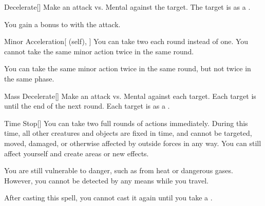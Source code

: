 \lowercase{\hypertarget{spell:Decelerate}{}}\label{spell:Decelerate}
\begin{freeability}[Rank 6]{\hypertarget{spell:Decelerate}{Decelerate}}[]
Make an attack vs. Mental against the target.
\hit The target is  as a .

\rankline
{} You gain a  bonus to  with the attack.
\end{freeability}
\vspace{0.25em}



\lowercase{\hypertarget{spell:Minor Acceleration}{}}\label{spell:Minor Acceleration}
\begin{attuneability}[Rank 6]{\hypertarget{spell:Minor Acceleration}{Minor Acceleration}}[ (self), ]
You can take two  each round instead of one.
You cannot take the same minor action twice in the same round.

\rankline
{} You can take the same minor action twice in the same round, but not twice in the same phase.
\end{attuneability}
\vspace{0.25em}



\lowercase{\hypertarget{spell:Mass Decelerate}{}}\label{spell:Mass Decelerate}
\begin{freeability}[Rank 7]{\hypertarget{spell:Mass Decelerate}{Mass Decelerate}}[]
Make an attack vs. Mental against each target.
\hit Each target is  until the end of the next round.
\crit Each target is  as a .
\end{freeability}
\vspace{0.25em}



\lowercase{\hypertarget{spell:Time Stop}{}}\label{spell:Time Stop}
\begin{freeability}[Rank 8]{\hypertarget{spell:Time Stop}{Time Stop}}[]
You can take two full rounds of actions immediately.
During this time, all other creatures and objects are fixed in time, and cannot be targeted, moved, damaged, or otherwise affected by outside forces in any way.
You can still affect yourself and create areas or new effects.

You are still vulnerable to danger, such as from heat or dangerous gases.
However, you cannot be detected by any means while you travel.

After casting this spell, you cannot cast it again until you take a .
\end{freeability}
\vspace{0.25em}



